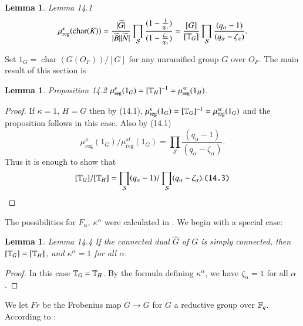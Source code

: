 \documentclass[11pt]{amsart}
\theoremstyle{plain}
\newtheorem{lemma}[theorem]{Lemma}
\theoremstyle{definition}
\def\taglet#1{\text{\tt (#1)}}
\def\Char{\operatorname{char}}               %
\def\what#1{\widehat#1}
\def\Vol{\operatorname{vol}}
\def\reg{\operatorname{reg}}
\def\tild#1{\widetilde#1}
\def\CurlyS{{\mathcal S}}
\def\CARTER{3}
\def\HALEST{11}
\begin{document}

\begin{lemma}{Lemma 14.1}
$$
\mu_{\reg}^\kappa(\Char(K))=
\frac{|\tild G|}{|\tild B||\tild N|}
\prod_\CurlyS
\frac{
(1-\frac1{q_\alpha})}
{(1-\frac{\zeta_\alpha}{q_\alpha})}
= \frac{[G]}{[\Bbb T_G]}
\prod_\CurlyS
\frac{
(q_\alpha-1)}
{(q_\alpha-\zeta_\alpha)}.
$$
\end{lemma}

Set $1_G={\Char(G(O_F))}/{[G]}$ for any
unramified group $G$ over $O_F$.  The main result of this section
is

\begin{lemma}{Proposition 14.2} $\mu_{\reg}^\kappa(1_G)
= {[\Bbb T_H]}^{-1} =\mu_{\reg}^{st}(1_H)$.
\end{lemma}

\begin{proof}  If $\kappa = 1$, $H = G$ then by 
(14.1), $\mu_{\reg}^\kappa(1_G)=
{[\Bbb T_G]^{-1}} =\mu_{\reg}^{st}(1_G)$
and the proposition follows in this case.  Also by (14.1)
$$
\mu_{\reg}^\kappa(1_G)/\mu_{\reg}^{st}(1_G)=\prod_\CurlyS
\frac{(q_\alpha-1)}{(q_\alpha-\zeta_\alpha)}.
$$
Thus it is enough to show that
$$
[\Bbb T_G]/[\Bbb T_H]
=\prod_\CurlyS(q_\alpha-1)/\prod_\CurlyS(q_\alpha-\zeta_\alpha).\taglet{14.3}
$$
\end{proof}

The possibilities for $F_{\alpha}$, $\kappa^\alpha$ 
were calculated in \cite{\HALEST,VI-2,3}.
We begin with a special case:

\begin{lemma}{Lemma 14.4}  If the connected dual $\what G$ of $G$ 
is simply connected, 
then $[\Bbb T_G] = [\Bbb T_H]$, and
$\kappa^\alpha =1$ for all $\alpha$.
\end{lemma}

\begin{proof}  
In this case $\Bbb T_G = \Bbb T_H$.  By the formula
defining $\kappa^\alpha$, we have $\zeta_\alpha = 1$
for all $\alpha$.
\end{proof}

We let $Fr$ be the Frobenius map $G\to G$ for $G$ a reductive group over $\Bbb F_q$.
According to  \cite{\CARTER,3.3.5}:
\end{document}
